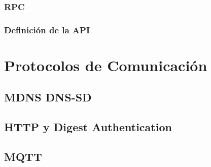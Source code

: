 \subsubsection{RPC}
\subsubsection{Definición de la API}

\section{Protocolos de Comunicación}
\subsection{MDNS DNS-SD}
\subsection{HTTP y Digest Authentication}
\subsection{MQTT}

